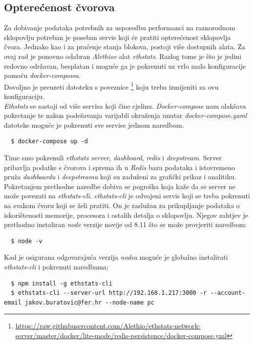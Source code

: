 \documentclass[times, utf8, zavrsni, numeric]{fer}
\begin{document}
\subsection{Opterećenost čvorova}
Za dobivanje podataka potrebnih za usporedbu performanci na raznorodnom sklopovlju potreban je poseban servis koji će pratiti
opterećenost sklopovlja čvora. Jednako kao i za praćenje stanja blokova, postoji više dostupnih alata. Za ovaj rad je ponovno
odabran \emph{Alethiov} alat \emph{ethstats}. Razlog tome je što je jedini redovno održavan, besplatan i moguće ga je pokrenuti
uz vrlo malo konfiguracije pomoću \emph{docker-composea}. \\
Dovoljno je preuzeti datoteku s poveznice
 \footnote{\url{https://raw.githubusercontent.com/Alethio/ethstats-network-server/master/docker/lite-mode/redis-persistence/docker-compose.yml}} koju 
 treba izmijeniti za ovu konfiguraciju. \\
\emph{Ethstats} se sastoji od više servisa koji čine cjelinu. \emph{Docker-compose} nam olakšava pokretanje te nakon podešavanja
varijabli okruženja unutar \emph{docker-compose.yaml} datoteke moguće je pokrenuti sve servise jednom naredbom.
\begin{lstlisting}
  $ docker-compose up -d
\end{lstlisting}
Time smo pokrenuli \emph{ethstats server}, \emph{dashboard}, \emph{redis} i \emph{deepstream}.
Server pribavlja podatke s čvorova i sprema ih u \emph{Redis} bazu podataka i istovremeno pruža \emph{dashboardu} i \emph{deepstreamu} koji
su zaduženi za grafički prikaz i analitiku. \\
Pokretanjem prethodne naredbe dobiva se pogreška koja kaže da se server ne može povezati na \emph{ethstats-cli}. \emph{ethstats-cli} 
je odvojeni servis koji se treba pokrenuti na svakom čvoru koji se želi pratiti. On je zaslužan za prikupljanje podataka o iskorištenosti
memorije, procesora i ostalih detalja o sklopovlju. Njegov zahtjev je prethodno instaliran \emph{node} verzije novije od 8.11 što se može 
provjeriti naredbom:
\begin{lstlisting}
  $ node -v
\end{lstlisting}
Kad je osigurana odgovarajuća verzija \emph{nodea} moguće je globalno instalirati \emph{ethstats-cli} i pokrenuti naredbama:
\begin{lstlisting}
  $ npm install -g ethstats-cli
  $ ethstats-cli --server-url http://192.168.1.217:3000 -r --account-email jakov.buratovic@fer.hr --node-name pc
\end{lstlisting}
\end{document}
